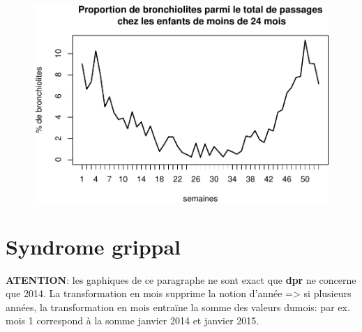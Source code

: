 \documentclass[]{article}
\newenvironment{Shaded}{\begin{snugshade}}{\end{snugshade}}
\newcommand{\KeywordTok}[1]{\textcolor[rgb]{0.13,0.29,0.53}{\textbf{{#1}}}}
\newcommand{\DataTypeTok}[1]{\textcolor[rgb]{0.13,0.29,0.53}{{#1}}}
\newcommand{\CharTok}[1]{\textcolor[rgb]{0.31,0.60,0.02}{{#1}}}
\newcommand{\StringTok}[1]{\textcolor[rgb]{0.31,0.60,0.02}{{#1}}}
\newcommand{\CommentTok}[1]{\textcolor[rgb]{0.56,0.35,0.01}{\textit{{#1}}}}
\newcommand{\NormalTok}[1]{{#1}}
\begin{document}
\begin{Shaded}
\end{Shaded}

\begin{figure}[htbp]
\centering
\includegraphics{dp_files/figure-latex/bronchiolites-5.pdf}
\end{figure}

\section{Syndrome grippal}\label{syndrome-grippal}

\textbf{ATENTION}: les gaphiques de ce paragraphe ne sont exact que
\textbf{dpr} ne concerne que 2014. La transformation en mois supprime la
notion d'année =\textgreater{} si plusieurs années, la transformation en
mois entraïne la somme des valeurs dumois: par ex. mois 1 correspond à
la somme janvier 2014 et janvier 2015.
\end{document}
